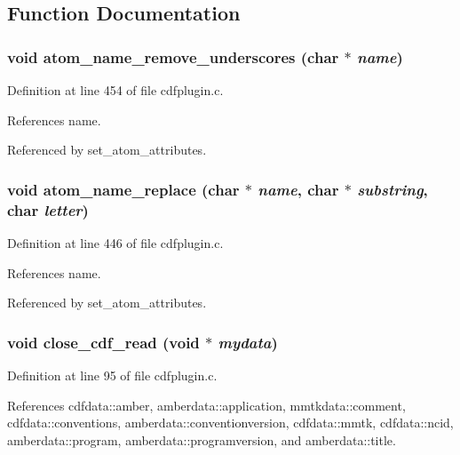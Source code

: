 \subsection{Function Documentation}
\subsubsection{\setlength{\rightskip}{0pt plus 5cm}void atom\_\-name\_\-remove\_\-underscores (char $\ast$ {\em name})\hspace{0.3cm}{\tt  [static]}}\label{cdfplugin_8c_a10}




Definition at line 454 of file cdfplugin.c.

References name.

Referenced by set\_\-atom\_\-attributes.
\subsubsection{\setlength{\rightskip}{0pt plus 5cm}void atom\_\-name\_\-replace (char $\ast$ {\em name}, char $\ast$ {\em substring}, char {\em letter})\hspace{0.3cm}{\tt  [static]}}\label{cdfplugin_8c_a9}




Definition at line 446 of file cdfplugin.c.

References name.

Referenced by set\_\-atom\_\-attributes.
\subsubsection{\setlength{\rightskip}{0pt plus 5cm}void close\_\-cdf\_\-read (void $\ast$ {\em mydata})\hspace{0.3cm}{\tt  [static]}}\label{cdfplugin_8c_a4}




Definition at line 95 of file cdfplugin.c.

References cdfdata::amber, amberdata::application, mmtkdata::comment, cdfdata::conventions, amberdata::conventionversion, cdfdata::mmtk, cdfdata::ncid, amberdata::program, amberdata::programversion, and amberdata::title.

